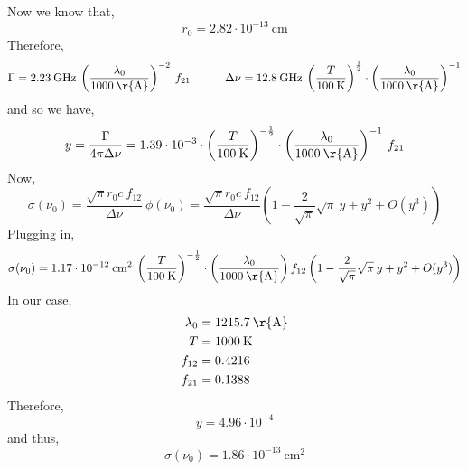 \documentclass[12pt]{article}
\begin{document}
Now we know that,
\[ r_0 = 2.82 \cdot 10^{-13} \: \mathrm{cm} \]
Therefore,
\[ \Gamma = 2.23 \: \mathrm{GHz} \: \left( \frac{\lambda_0}{1000 \: \mathrm{\r{A}} } \right)^{-2} \: f_{21} \quad \quad \quad \Delta \nu = 12.8 \: \mathrm{GHz} \: \left( \frac{T}{100 \: \mathrm{K}} \right)^{\frac{1}{2}} \cdot \left( \frac{\lambda_0}{1000 \: \mathrm{\r{A}} } \right)^{-1} \]
and so we have,
\[ y = \frac{\Gamma}{4 \pi \Delta \nu} = 1.39 \cdot 10^{-3} \cdot \left( \frac{T}{100 \: \mathrm{K}} \right)^{-\frac{1}{2}} \cdot \left( \frac{\lambda_0}{1000 \: \mathrm{\r{A}} } \right)^{-1} \: f_{21} \]
Now,
\[ \sigma(\nu_0) = \frac{\sqrt{\pi} r_0 c \: f_{12}}{\Delta \nu} \: \phi(\nu_0) = \frac{\sqrt{\pi} r_0 c \: f_{12}}{\Delta \nu} \left( 1 - \frac{2}{\sqrt{\pi}} \sqrt{\pi} \: y + y^2 + O(y^3) \right) \]
Plugging in,
\[ \sigma(\nu_0) = 1.17 \cdot 10^{-12} \: \mathrm{cm}^2 \: \left( \frac{T}{100 \: \mathrm{K}} \right)^{-\frac{1}{2}} \cdot \left( \frac{\lambda_0}{1000 \: \mathrm{\r{A}} } \right) f_{12} \left( 1 - \frac{2}{\sqrt{\pi}} \sqrt{\pi} \: y +  y^2 + O(y^3) \right) \]
In our case, 
\begin{align*}
\lambda_0 & = 1215.7 \: \mathrm{\r{A}} 
\\
T & = 1000 \: \mathrm{K}
\\
f_{12} & = 0.4216
\\
f_{21} & = 0.1388
\end{align*}
Therefore,
\[ y = 4.96 \cdot 10^{-4} \]
and thus,
\[ \sigma(\nu_0) = 1.86 \cdot 10^{-13} \: \mathrm{cm}^2 \]
\end{document}
